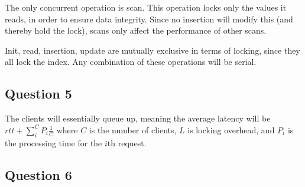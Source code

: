 \documentclass[11pt,a4paper]{article}
\begin{document}
The only concurrent operation is scan. This operation locks only the values it
reads, in order to ensure data integrity. Since no insertion will modify this
(and thereby hold the lock), scans only affect the performance of other scans.

Init, read, insertion, update are mutually exclusive in terms of locking, since
they all lock the index. Any combination of these operations will be serial.

\subsection{Question 5}

The clients will essentially queue up, meaning the average latency will be
$rtt + \sum_i^C P_i \frac 1 C$ where $C$ is the number of clients, $L$ is
locking overhead, and $P_i$ is the processing time for the $i$th request.




\subsection{Question 6}
\end{document}
